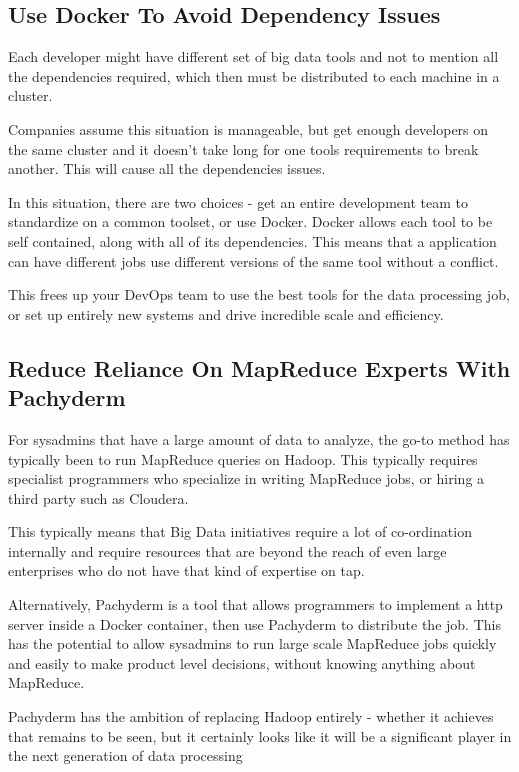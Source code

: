 \documentclass[sigconf]{acmart}
\begin{document}
	\subsection{Use Docker To Avoid Dependency Issues}
	
	Each developer might have different set of big data tools and not to mention all the dependencies required, which then must be distributed to each machine in a cluster.
	
	Companies assume this situation is manageable, but get enough developers on the same cluster and it doesn't take long for one tools requirements to break another. This will cause all the dependencies issues.
	
	In this situation, there are two choices - get an entire development team to standardize on a common toolset, or use Docker. Docker allows each tool to be self contained, along with all of its dependencies. This means that a application can have different jobs use different versions of the same tool without a conflict.
	
	This frees up your DevOps team to use the best tools for the data processing job, or set up entirely new systems and drive incredible scale and efficiency.
	
	\subsection{Reduce Reliance On MapReduce Experts With Pachyderm}
	For sysadmins that have a large amount of data to analyze, the go-to method has typically been to run MapReduce queries on Hadoop. This typically requires specialist programmers who specialize in writing MapReduce jobs, or hiring a third party such as Cloudera.
	
	This typically means that Big Data initiatives require a lot of co-ordination internally and require resources that are beyond the reach of even large enterprises who do not have that kind of expertise on tap.
	
	Alternatively, Pachyderm is a tool that allows programmers to implement a http server inside a Docker container, then use Pachyderm to distribute the job. This has the potential to allow sysadmins to run large scale MapReduce jobs quickly and easily to make product level decisions, without knowing anything about MapReduce.\cite{pachyderm}
	
	Pachyderm has the ambition of replacing Hadoop entirely - whether it achieves that remains to be seen, but it certainly looks like it will be a significant player in the next generation of data processing
\end{document}
